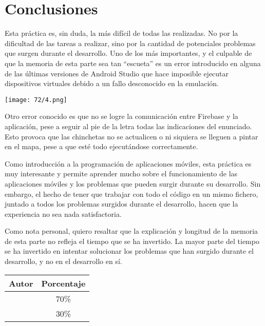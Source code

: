 \section{Conclusiones}
Esta práctica es, sin duda, la más difícil de todas las realizadas. No por la dificultad de las
tareas a realizar, sino por la cantidad de potenciales problemas que surgen durante el desarrollo.
Uno de los más importantes, y el culpable de que la memoria de esta parte sea tan ``escueta'' es
un error introducido en alguna de las últimas versiones de Android Studio que hace imposible
ejecutar dispositivos virtuales debido a un fallo desconocido en la emulación.

\begin{minipage}{\linewidth}
	\centering
	\texttt{[image: 72/4.png]}
	\label{fig:7/13}
\end{minipage}

Otro error conocido es que no se logre la comunicación entre Firebase y la aplicación, pese a seguir
al pie de la letra todas las indicaciones del enunciado. Esto provoca que las chinchetas no se
actualicen o ni siquiera se lleguen a pintar en el mapa, pese a que esté todo ejecutándose correctamente.

Como introducción a la programación de aplicaciones móviles, esta práctica es muy interesante y
permite aprender mucho sobre el funcionamiento de las aplicaciones móviles y los problemas que
pueden surgir durante su desarrollo. Sin embargo, el hecho de tener que trabajar con todo el código en
un mismo fichero, juntado a todos los problemas surgidos durante el desarrollo, hacen que la experiencia no sea
nada satisfactoria.

Como nota personal, quiero resaltar que la explicación y longitud de la memoria de esta parte no refleja
el tiempo que se ha invertido. La mayor parte del tiempo se ha invertido en intentar solucionar los
problemas que han surgido durante el desarrollo, y no en el desarrollo en sí.

\begin{center}
	\begin{tabular}{|c|c|}
		\hline
		\textbf{Autor} & \textbf{Porcentaje} \\
		\hline
		\hline
		\authorOne & 70\% \\
		\authorTwo & 30\% \\
		\hline
	\end{tabular}
\end{center}
